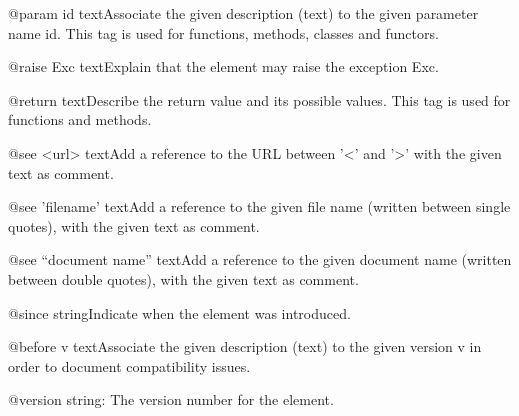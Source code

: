 @param id textAssociate the given description (text) to the given
parameter name id. This tag is used for functions, methods, classes
and functors.


@raise Exc textExplain that the element may raise the exception Exc.


@return textDescribe the return value and its possible values. This
tag is used for functions and methods.


@see <url> textAdd a reference to the URL between '<' and '>' with the
given text as comment.


@see 'filename' textAdd a reference to the given file name (written
between single quotes), with the given text as comment.


@see ``document name'' textAdd a reference to the given document name
(written between double quotes), with the given text as comment.


@since stringIndicate when the element was introduced.


@before v textAssociate the given description (text) to the given
version v in order to document compatibility issues.


@version string: The version number for the element.
